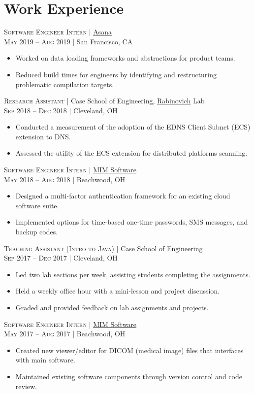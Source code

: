 \documentclass[a4paper,11pt]{article}
\begin{document}
\section{Work Experience}
\textsc{Software Engineer Intern} | \href{https://asana.com}{Asana} \\
\textsc{May 2019 – Aug 2019} | San Francisco, CA
\begin{itemize}
	\item Worked on data loading frameworks and abstractions for product teams.
	\item Reduced build times for engineers by identifying and restructuring problematic compilation targets.
\end{itemize}
\vskip 2mm
\textsc{Research Assistant} | Case School of Engineering, \href{http://engr.case.edu/rabinovich_michael/}{Rabinovich} Lab \\
\textsc{Sep 2018 – Dec 2018} | Cleveland, OH
\begin{itemize}
	\item Conducted a measurement of the adoption of the EDNS Client Subnet (ECS) extension to DNS.
	\item Assessed the utility of the ECS extension for distributed platforms scanning.
\end{itemize}
\vskip 2mm
\textsc{Software Engineer Intern} | \href{https://www.mimsoftware.com}{MIM Software} \\
\textsc{May 2018 – Aug 2018} | Beachwood, OH
\begin{itemize}
	\item Designed a multi-factor authentication framework for an existing cloud software suite.
	\item Implemented options for time-based one-time passwords, SMS messages, and backup codes.
\end{itemize}
\vskip 2mm
\textsc{Teaching Assistant (Intro to Java)} | Case School of Engineering \\
 \textsc{Sep 2017 – Dec 2017} | Cleveland, OH
 \begin{itemize}
	 \item	Led two lab sections per week, assisting students completing the assignments.
	 \item Held a weekly office hour with a mini-lesson and project discussion.
	 \item Graded and provided feedback on lab assignments and projects.
 \end{itemize}
 \vskip 2mm
 \textsc{Software Engineer Intern} | \href{https://www.mimsoftware.com}{MIM Software} \\
 \textsc{May 2017 – Aug 2017} | Beachwood, OH
 \begin{itemize}
	\item Created new viewer/editor for DICOM (medical image) files that interfaces with main software.
	\item Maintained existing software components through version control and code review.
 \end{itemize}
\end{document}
